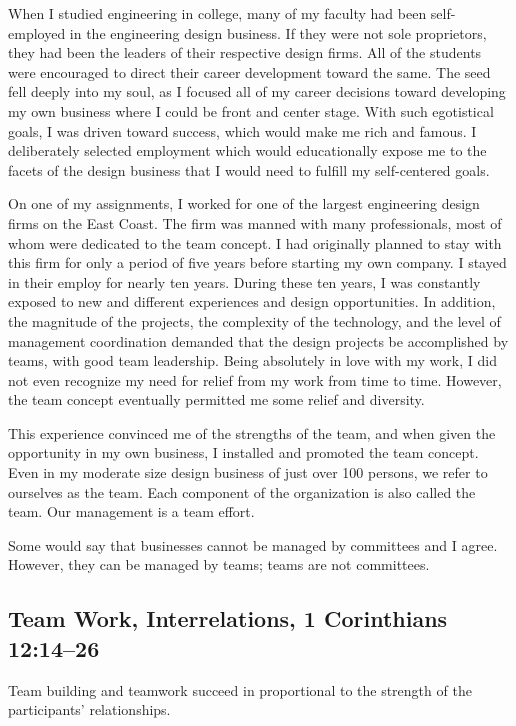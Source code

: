 \documentclass[12pt]{memoir}
\begin{document}
When I studied engineering in college, many of my faculty had been
self-employed in the engineering design business. If they were not
sole proprietors, they had been the leaders of their respective design
firms. All of the students were encouraged to direct their career
development toward the same. The seed fell deeply into my soul, as
I focused all of my career decisions toward developing my own business
where I could be front and center stage. With such egotistical
goals, I was driven toward success, which would make me
rich and famous. I deliberately selected employment which would
educationally expose me to the facets of the design business that
I would need to fulfill my self-centered goals.

On one of my assignments, I worked for one of the largest engineering
design firms on the East Coast. The firm was manned with many professionals, most of whom were dedicated to the team concept. I had originally
planned to stay with this firm for only a period of five years before
starting my own company. I stayed in their employ for nearly ten years.
During these ten years, I was constantly exposed to new and different
experiences and design opportunities. In addition, the magnitude of
the projects, the complexity of the technology, and the level of management
coordination demanded that the design projects be accomplished by
teams, with good team leadership. Being absolutely in love with my
work, I did not even recognize my need for relief from my work from
time to time. However, the team concept eventually permitted me some
relief and diversity.

This experience convinced me of the strengths of the team, and when given the opportunity in my own business, I installed and promoted the team concept. Even in my moderate size design business of just over 100 persons, we refer to ourselves as the team. Each component of the organization is also called the team. Our management is a team effort.

Some would say that businesses cannot be managed by committees and
I agree. However, they can be managed by teams; teams are not committees.

\subsection[Team Work, Interrelations]{Team Work, Interrelations, 1 Corinthians 12:14--26}

Team building and teamwork succeed in proportional to the strength
of the participants' relationships.
\end{document}
